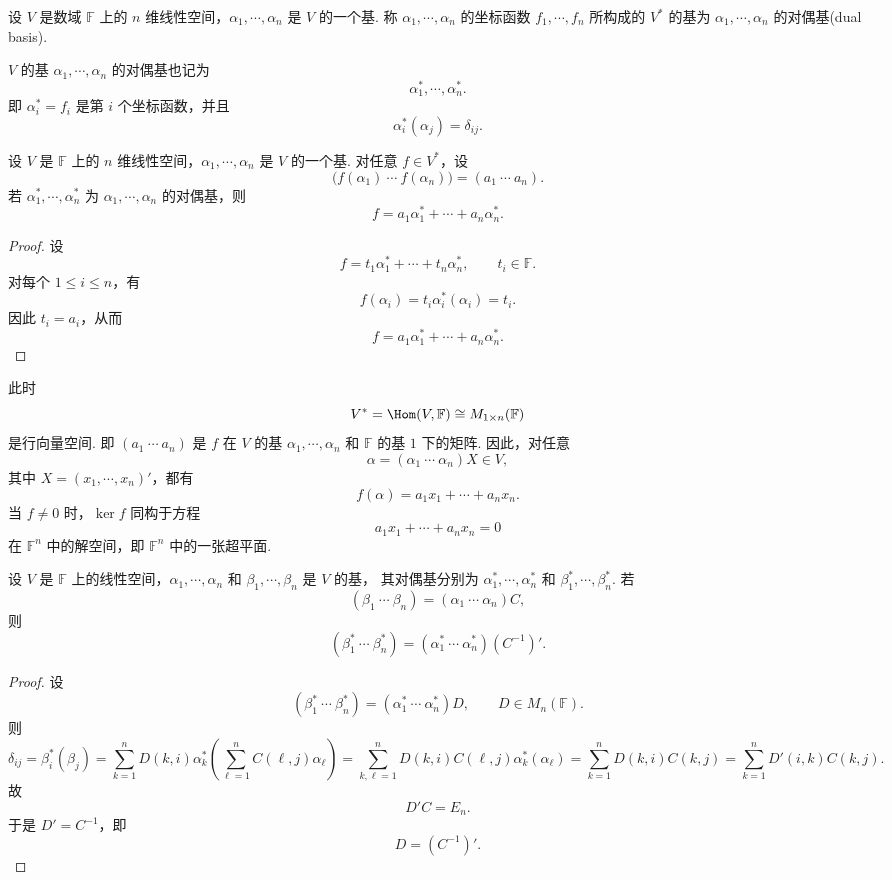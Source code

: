 \begin{definition}
	设 $V$ 是数域 $\mathbb{F}$ 上的 $n$ 维线性空间，$\alpha_1,\cdots,\alpha_n$ 是 $V$ 的一个基.
	称 $\alpha_1,\cdots,\alpha_n$ 的坐标函数 $f_1,\cdots,f_n$ 所构成的 $V^*$ 的基为
	$\alpha_1,\cdots,\alpha_n$ 的对偶基(dual basis).
\end{definition}


	$V$ 的基 $\alpha_1,\cdots,\alpha_n$ 的对偶基也记为
	\[
	\alpha_1^*,\cdots,\alpha_n^*.
	\]
	即 $\alpha_i^*=f_i$ 是第 $i$ 个坐标函数，并且
	\[
	\alpha_i^*(\alpha_j)=\delta_{ij}.
	\]


\begin{lemma}
	设 $V$ 是 $\mathbb{F}$ 上的 $n$ 维线性空间，$\alpha_1,\cdots,\alpha_n$ 是 $V$ 的一个基.
	对任意 $f\in V^*$，设
	\[
	\bigl(f(\alpha_1)\ \cdots\ f(\alpha_n)\bigr)=(a_1\ \cdots\ a_n).
	\]
	若 $\alpha_1^*,\cdots,\alpha_n^*$ 为 $\alpha_1,\cdots,\alpha_n$ 的对偶基，则
	\[
	f=a_1\alpha_1^*+\cdots+a_n\alpha_n^*.
	\]
\end{lemma}

\begin{proof}
	设
	\[
	f=t_1\alpha_1^*+\cdots+t_n\alpha_n^*,\qquad t_i\in\mathbb{F}.
	\]
	对每个 $1\leq i\leq n$，有
	\[
	f(\alpha_i)=t_i\alpha_i^*(\alpha_i)=t_i.
	\]
	因此 $t_i=a_i$，从而
	\[
	f=a_1\alpha_1^*+\cdots+a_n\alpha_n^*.
	\]
\end{proof}


	此时
	\[
	V^*=\Hom(V,\mathbb{F})\cong M_{1\times n}(\mathbb{F})
	\]
	是行向量空间. 即 $(a_1\ \cdots\ a_n)$ 是 $f$ 在 $V$ 的基 $\alpha_1,\cdots,\alpha_n$ 和
	$\mathbb{F}$ 的基 $1$ 下的矩阵.
	因此，对任意
	\[
	\alpha=(\alpha_1\ \cdots\ \alpha_n)X\in V,
	\]
	其中 $X=(x_1,\cdots,x_n)'$，都有
	\[
	f(\alpha)=a_1x_1+\cdots+a_nx_n.
	\]
	当 $f\ne0$ 时，$\ker f$ 同构于方程
	\[
	a_1x_1+\cdots+a_nx_n=0
	\]
	在 $\mathbb{F}^n$ 中的解空间，即 $\mathbb{F}^n$ 中的一张超平面.


\begin{lemma}
	设 $V$ 是 $\mathbb{F}$ 上的线性空间，$\alpha_1,\cdots,\alpha_n$ 和 $\beta_1,\cdots,\beta_n$ 是 $V$ 的基，
	其对偶基分别为 $\alpha_1^*,\cdots,\alpha_n^*$ 和 $\beta_1^*,\cdots,\beta_n^*$.
	若
	\[
	(\beta_1\ \cdots\ \beta_n)=(\alpha_1\ \cdots\ \alpha_n)C,
	\]
	则
	\[
	(\beta_1^*\ \cdots\ \beta_n^*)=(\alpha_1^*\ \cdots\ \alpha_n^*)(C^{-1})'.
	\]
\end{lemma}

\begin{proof}
	设
	\[
	(\beta_1^*\ \cdots\ \beta_n^*)=(\alpha_1^*\ \cdots\ \alpha_n^*)D,
	\qquad D\in M_n(\mathbb{F}).
	\]
	则
	\[
	\delta_{ij}
	=\beta_i^*(\beta_j)=\sum_{k=1}^nD(k,i)\alpha_k^*\left(\sum_{\ell=1}^n C(\ell,j)\alpha_\ell\right)=\sum_{k,\ell=1}^nD(k,i)C(\ell,j)\alpha_k^*(\alpha_\ell)=\sum_{k=1}^nD(k,i)C(k,j)=\sum_{k=1}^nD'(i,k)C(k,j).
	\]
	故
	\[
	D'C=E_n.
	\]
	于是 $D'=C^{-1}$，即
	\[
	D=(C^{-1})'.
	\]
\end{proof}

